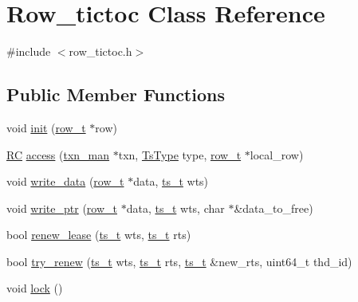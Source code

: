 \hypertarget{classRow__tictoc}{}\section{Row\+\_\+tictoc Class Reference}
\label{classRow__tictoc}


{\ttfamily \#include $<$row\+\_\+tictoc.\+h$>$}

\subsection*{Public Member Functions}
\begin{DoxyCompactItemize}
\item 
void \hyperlink{classRow__tictoc_a44d46cc09bdf8f078f992075a2e126c9}{init} (\hyperlink{classrow__t}{row\+\_\+t} $\ast$row)
\item 
\hyperlink{global_8h_a78c49a674c810fdd03d20432f7be864a}{RC} \hyperlink{classRow__tictoc_a6a5b77a305775780a23dc7227ccef937}{access} (\hyperlink{classtxn__man}{txn\+\_\+man} $\ast$txn, \hyperlink{global_8h_a1a7f6ca1462293fe053b5ae74a6c4eda}{Ts\+Type} type, \hyperlink{classrow__t}{row\+\_\+t} $\ast$local\+\_\+row)
\item 
void \hyperlink{classRow__tictoc_a6af47480f6f4230236f47b2f2b2de429}{write\+\_\+data} (\hyperlink{classrow__t}{row\+\_\+t} $\ast$data, \hyperlink{global_8h_aaf095dfc9b10f757c968fe146ad7e724}{ts\+\_\+t} wts)
\item 
void \hyperlink{classRow__tictoc_a8cfc065bb14c25213e614798ba8b3b4a}{write\+\_\+ptr} (\hyperlink{classrow__t}{row\+\_\+t} $\ast$data, \hyperlink{global_8h_aaf095dfc9b10f757c968fe146ad7e724}{ts\+\_\+t} wts, char $\ast$\&data\+\_\+to\+\_\+free)
\item 
bool \hyperlink{classRow__tictoc_a49259f37a6c3ab9f74fe861b7f4ba8f6}{renew\+\_\+lease} (\hyperlink{global_8h_aaf095dfc9b10f757c968fe146ad7e724}{ts\+\_\+t} wts, \hyperlink{global_8h_aaf095dfc9b10f757c968fe146ad7e724}{ts\+\_\+t} rts)
\item 
bool \hyperlink{classRow__tictoc_a0e3056dff2f6ebc21de23fbd3ac35ea6}{try\+\_\+renew} (\hyperlink{global_8h_aaf095dfc9b10f757c968fe146ad7e724}{ts\+\_\+t} wts, \hyperlink{global_8h_aaf095dfc9b10f757c968fe146ad7e724}{ts\+\_\+t} rts, \hyperlink{global_8h_aaf095dfc9b10f757c968fe146ad7e724}{ts\+\_\+t} \&new\+\_\+rts, uint64\+\_\+t thd\+\_\+id)
\item 
void \hyperlink{classRow__tictoc_a534c6fe17f2cf8fffc7a1b06eef67b03}{lock} ()
\item 

\end{DoxyCompactItemize}
